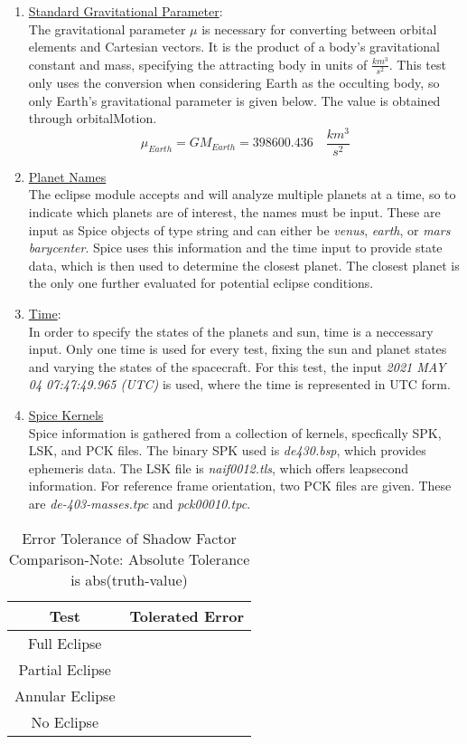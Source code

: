 \begin{enumerate}
\begin{table}[H]
\begin{tabular}{c|c|c|c}
			\hline
		\end{tabular}
	\end{table}
	\item \underline{Standard Gravitational Parameter}:\\
	The gravitational parameter $\mu$ is necessary for converting between orbital elements and Cartesian vectors. It is the product of a body's gravitational constant and mass, specifying the attracting body in units of $\frac{km^3}{s^2}$. This test only uses the conversion when considering Earth as the occulting body, so only Earth's gravitational parameter is given below. The value is obtained through orbitalMotion.
	\begin{equation}
		\mu_{Earth} = GM_{Earth}=398600.436\quad \frac{km^3}{s^2}
	\end{equation}
	\item \underline{Planet Names}\\
	The eclipse module accepts and will analyze multiple planets at a time, so to indicate which planets are of interest, the names must be input. These are input as Spice objects of type string and can either be \textit{venus}, \textit{earth}, or \textit{mars barycenter}. Spice uses this information and the time input to provide state data, which is then used to determine the closest planet. The closest planet is the only one further evaluated for potential eclipse conditions.
	\item \underline{Time}:\\
	In order to specify the states of the planets and sun, time is a neccessary input. Only one time is used for every test, fixing the sun and planet states and varying the states of the spacecraft. For this test, the input \textit{2021 MAY 04 07:47:49.965 (UTC)} is used, where the time is represented in UTC form.
	\item \underline{Spice Kernels}\\
	Spice information is gathered from a collection of kernels, specfically SPK, LSK, and PCK files. The binary SPK used is \textit{de430.bsp}, which provides ephemeris data. The LSK file is \textit{naif0012.tls}, which offers leapsecond information. For reference frame orientation, two PCK files are given. These are \textit{de-403-masses.tpc} and \textit{pck00010.tpc}.
\end{enumerate}	
\begin{table}[H]
	\caption{Error Tolerance of Shadow Factor Comparison-Note: Absolute Tolerance is abs(truth-value)}
	\centering \fontsize{10}{10}\selectfont
	\begin{tabular}{c|c}
		\hline \textbf{Test} & \textbf{Tolerated Error}\\ \hline Full Eclipse & \\ Partial Eclipse & \\
		Annular Eclipse & \\
		No Eclipse& \\
		\hline
	\end{tabular}
\end{table}

